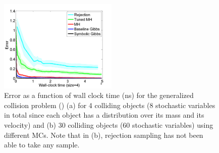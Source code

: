 \documentclass{article}
\begin{document}
\begin{figure}
\centering
     \includegraphics[width=0.8\linewidth, height=125pt]
{Figs/plots/collision/err-vs-time__param4-shaded.pdf}
      \caption{Error %
as a function of wall clock time (ns) for the generalized collision problem () 
(a) for 4 colliding objects (8 stochastic variables in total since each object has a distribution over its mass and its velocity) and (b) 30 colliding objects (60 stochastic variables)
using different MCs. Note that in (b), rejection sampling has not been able to take any sample.}
\end{figure}
\end{document}
